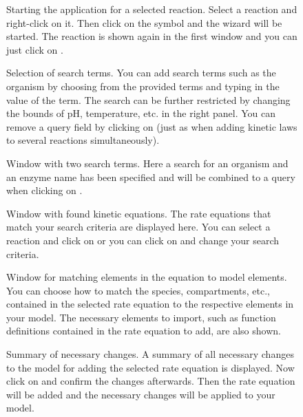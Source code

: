\begin{figure}[htbp]
\caption[Starting the \SABIO application for a selected reaction]{Starting the \SABIO application for a selected reaction.
Select a reaction and right-click on it.
Then click on the \SABIO symbol and the wizard will be started.
The reaction is shown again in the first window and you can just click on .}
\label{fig:startManual}
\end{figure}
\begin{figure}[htbp]
\caption[Selection of search terms]{Selection of search terms.
You can add search terms such as the organism by choosing from the provided terms and
typing in the value of the term. The search can be further restricted by changing the
bounds of pH, temperature, etc. in the right panel. 
You can remove a query field by clicking on 
(just as when adding kinetic laws to several reactions simultaneously).}
\label{fig:searchTermsManual}
\end{figure}
\begin{figure}[htbp]
\caption[Window with two search terms]{Window with two search terms.
Here a search for an organism and an enzyme name has been specified and will be
combined to a query when clicking on .}
\label{fig:searchTermsQuery}
\end{figure}
\begin{figure}[htbp]
\caption[Window with found kinetic equations]{Window with found kinetic equations.
The rate equations that match your search criteria are displayed here.
You can select a reaction and click on  or you can click on 
and change your search criteria.}
\label{fig:foundEquationsManual}
\end{figure}
\begin{figure}[htbp]
\caption[Window for matching elements in the equation to model elements]{Window for matching elements in the equation to model elements.
You can choose how to match the species, compartments, etc., contained in the selected rate 
equation to the respective \SBML elements in your model. The necessary elements to import,
such as function definitions contained in the rate equation to add, are also shown.}
\label{fig:matching}
\end{figure}
\begin{figure}[htbp]
\caption[Summary of necessary changes]{Summary of necessary changes.
A summary of all necessary changes to the model for adding the selected rate equation is displayed.
Now click on  and confirm the changes afterwards. Then the rate equation will be
added and the necessary changes will be applied to your model.}
\label{fig:changesManual}
\end{figure}

